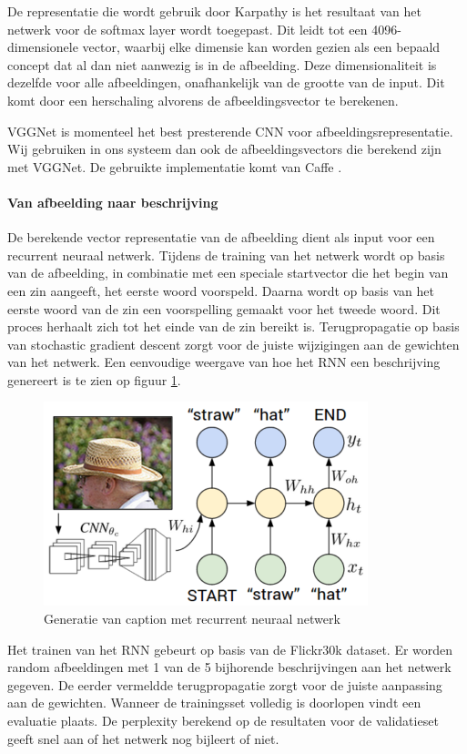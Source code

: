 De representatie die wordt gebruik door Karpathy is het resultaat van het netwerk voor de softmax layer wordt toegepast. Dit leidt tot een 4096-dimensionele vector, waarbij elke dimensie kan worden gezien als een bepaald concept dat al dan niet aanwezig is in de afbeelding. Deze dimensionaliteit is dezelfde voor alle afbeeldingen, onafhankelijk van de grootte van de input. Dit komt door een herschaling alvorens de afbeeldingsvector te berekenen.

VGGNet is momenteel het best presterende CNN voor afbeeldingsrepresentatie. Wij gebruiken in ons systeem dan ook de afbeeldingsvectors die berekend zijn met VGGNet. De gebruikte implementatie komt van Caffe .

\paragraph{Van afbeelding naar beschrijving}
De berekende vector representatie van de afbeelding dient als input voor een recurrent neuraal netwerk. Tijdens de training van het netwerk wordt op basis van de afbeelding, in combinatie met een speciale startvector die het begin van een zin aangeeft, het eerste woord voorspeld. Daarna wordt op basis van het eerste woord van de zin een voorspelling gemaakt voor het tweede woord. Dit proces herhaalt zich tot het einde van de zin bereikt is. Terugpropagatie op basis van stochastic gradient descent zorgt voor de juiste wijzigingen aan de gewichten van het netwerk. Een eenvoudige weergave van hoe het RNN een beschrijving genereert is te zien op figuur \ref{fig:rnntraining}.

\begin{figure}[tb]
    \centering
    \includegraphics[width=0.5\linewidth]{Images/karpathy.PNG}
    \caption{Generatie van caption met recurrent neuraal netwerk}
\label{fig:rnntraining}
\end{figure}

Het trainen van het RNN gebeurt op basis van de Flickr30k dataset. Er worden random afbeeldingen met 1 van de 5 bijhorende beschrijvingen aan het netwerk gegeven. De eerder vermeldde terugpropagatie zorgt voor de juiste aanpassing aan de gewichten. Wanneer de trainingsset volledig is doorlopen vindt een evaluatie plaats. De perplexity berekend op de resultaten voor de validatieset geeft snel aan of het netwerk nog bijleert of niet. 

